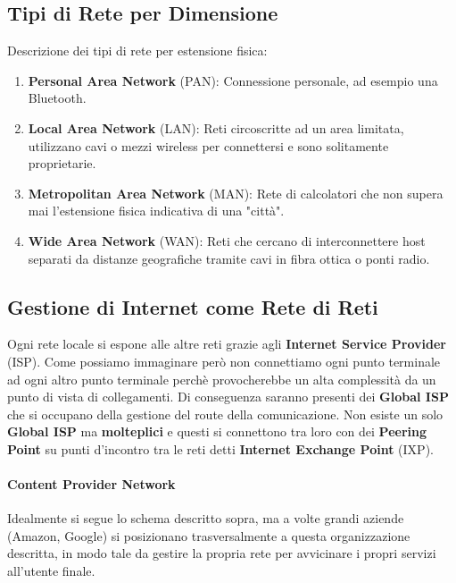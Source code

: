 \documentclass{article}
\begin{document}
\newpage

\subsection{Tipi di Rete per Dimensione}

Descrizione dei tipi di rete per estensione fisica:

\begin{enumerate}
    \item \textbf{Personal Area Network} (PAN): Connessione personale, ad esempio una Bluetooth.
    \item \textbf{Local Area Network} (LAN): Reti circoscritte ad un area limitata, utilizzano cavi o mezzi wireless per connettersi e sono solitamente proprietarie.
    \item \textbf{Metropolitan Area Network} (MAN): Rete di calcolatori che non supera mai l'estensione fisica indicativa di una "città".
    \item \textbf{Wide Area Network} (WAN): Reti che cercano di interconnettere host separati da distanze geografiche tramite cavi in fibra ottica o ponti radio.
\end{enumerate}

\subsection{Gestione di Internet come Rete di Reti}

Ogni rete locale si espone alle altre reti grazie agli \textbf{Internet Service Provider} (ISP). Come possiamo immaginare però
non connettiamo ogni punto terminale ad ogni altro punto terminale perchè provocherebbe un alta complessità da un punto di vista di collegamenti.
Di conseguenza saranno presenti dei \textbf{Global ISP} che si occupano della gestione del route della comunicazione. Non esiste un solo \textbf{Global ISP} ma \textbf{molteplici}
e questi si connettono tra loro con dei \textbf{Peering Point} su punti d'incontro tra le reti detti \textbf{Internet Exchange Point} (IXP).

\paragraph{Content Provider Network} Idealmente si segue lo schema descritto sopra, ma a volte grandi aziende (Amazon, Google) si posizionano trasversalmente a questa organizzazione descritta, in modo tale da
gestire la propria rete per avvicinare i propri servizi all'utente finale.
\end{document}
